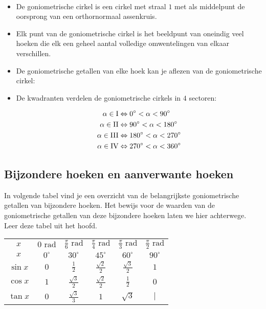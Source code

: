 \begin{onthoud}
	\ \\
	\begin{itemize}
	\item De goniometrische cirkel is een cirkel met straal $1$ met als middelpunt de oorsprong van een orthornormaal assenkruis.
	\item Elk punt van de goniometrische cirkel is het beeldpunt van oneindig veel hoeken die elk een geheel aantal volledige omwentelingen van elkaar verschillen.
	\item De goniometrische getallen van elke hoek kan je aflezen van de goniometrische cirkel:
 
\begin{figure}[H]
	\centering 
	 
\end{figure}


	\item De kwadranten verdelen de goniometrische cirkels in $4$ sectoren:
 
\begin{figure}[H]
	\centering 
	 
\end{figure}
 
\begin{align*}
\alpha \in \textup{I} &\Leftrightarrow 0^\circ < \alpha < 90^\circ\\
\alpha \in \textup{II} &\Leftrightarrow 90^\circ < \alpha < 180^\circ\\
\alpha \in \textup{III} &\Leftrightarrow 180^\circ < \alpha < 270^\circ\\
\alpha \in \textup{IV} &\Leftrightarrow 270^\circ < \alpha < 360^\circ
\end{align*}
\end{itemize}

\end{onthoud}

\subsection{Bijzondere hoeken en aanverwante hoeken}

In volgende tabel vind je een overzicht van de belangrijkste goniometrische getallen van bijzondere hoeken. Het bewijs voor de waarden van de goniometrische getallen van deze bijzondere hoeken laten we hier achterwege. Leer deze tabel uit het hoofd.

\begin{tabular}{c|ccccc}
$x$ &	$0 \text{ rad}$& $\frac{\pi}{6} \text{ rad}$ &	$\frac{\pi}{4} \text{ rad}$ &$\frac{\pi}{3} \text{ rad}$ &	 $\frac{\pi}{2} \text{ rad}$ \\
$x$ &	$0^\circ$&	$30^\circ$	&$45^\circ$&	$60^\circ$&	$90^\circ$\\
\hline
$\sin x$ &	$0$	&$\frac{1}{2}$&	$\frac{\sqrt{2}}{2}$& $\frac{\sqrt{3}}{2}$&	$1$ \\
$\cos x$ &	$1$	&$\frac{\sqrt{3}}{2}$&	$\frac{\sqrt{2}}{2}$&	$\frac{1}{2}$&	$0$ \\
$\tan x$ &	$0$	&$\frac{\sqrt{3}}{3}$&	$1$&	$\sqrt{3}$	 &  $|$ \\
\end{tabular}

